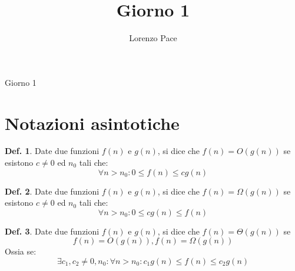 \documentclass[a4paper,10pt]{article}
\title{Giorno 1}
\author{Lorenzo Pace}
\theoremstyle{definition}
\newtheorem{deff}{Def.}[section]
\begin{document}
\begin{center}
    \LARGE Giorno 1
\end{center}


\section{Notazioni asintotiche}

\begin{multicols}{2}

\begin{deff}
    Date due funzioni $f(n)$ e $g(n)$, si dice che $f(n) = O(g(n))$ se esistono $c \neq 0$ ed $n_0$ tali che:
    \[\forall n > n_0 : 0 \leq f(n) \leq c g(n)\]
\end{deff}
\smallskip

\begin{deff}
 Date due funzioni $f(n)$ e $g(n)$, si dice che $f(n) = \Omega(g(n))$ se esistono $c \neq 0$ ed $n_0$ tali che:
 \[\forall n > n_0 : 0 \leq cg(n) \leq f(n)\]
\end{deff}
\begin{center}

    \end{center}

\end{multicols}

\begin{multicols}{2}

\begin{deff}
    Date due funzioni $f(n)$ e $g(n)$, si dice che $f(n) = \Theta(g(n))$ se \[f(n) = O(g(n)), f(n) = \Omega(g(n))\]
    Ossia se: 
    \[\exists c_1, c_2 \neq 0, n_0 : \forall n > n_0 : c_1g(n) \leq f(n) \leq c_2g(n)\]
\end{deff}
\bigskip
\bigskip
\begin{center}

    \end{center}

\end{multicols}
\end{document}
